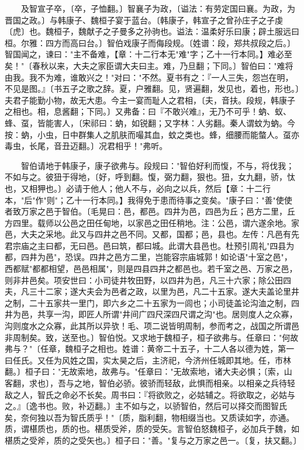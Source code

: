 　　及智宣子卒，〔卒，子恤翻。〕智襄子为政，〔谥法：有劳定国曰襄。为政，为晋国之政。〕与韩康子、魏桓子宴于蓝台。〔韩康子，韩宣子之曾孙庄子之子虔〔虎〕也。魏桓子，魏献子之子曼多之孙驹也。谥法：温柔好乐曰康；辟土服远曰桓。尔雅：四方而高曰台。〕智伯戏康子而侮段规。〔姓谱：段，郑共叔段之后。〕智国闻之，谏曰："主不备难，【章：十二行本无"难"字；乙十一行本同。】难必至矣！"〔春秋以来，大夫之家臣谓大夫曰主。难，乃旦翻；下同。〕智伯曰："难将由我。我不为难，谁敢兴之！"对曰："不然。夏书有之：『一人三失，怨岂在明，不见是图。』〔书五子之歌之辞。夏，户雅翻。见，贤遍翻，发见也，着也，形也。〕夫君子能勤小物，故无大患。今主一宴而耻人之君相，〔夫，音扶。段规，韩康子之相也。相，息酱翻；下同。〕又弗备：曰『不敢兴难』，无乃不可乎！蚋、蚁、蜂、虿，皆能害人，〔宋祁曰：蚋，如锐翻；又字林：人劣翻。秦人谓蚊为蚋。今按：蚋，小虫，日中群集人之肌肤而嘬其血，蚊之类也。蜂，细腰而能螫人。虿亦毒虫，长尾，音丑迈翻。〕况君相乎！"弗听。

　　智伯请地于韩康子，康子欲弗与。段规曰："智伯好利而愎，不与，将伐我；不如与之。彼狃于得地，〔好，呼到翻。愎，弼力翻，狠也。狃，女九翻，骄，忲也，又相狎也。〕必请于他人；他人不与，必向之以兵，然后【章：十二行本，"后"作"则"；乙十一行本同。】我得免于患而待事之变矣。"康子曰："善"使使者致万家之邑于智伯。〔毛晃曰：邑，都邑。四井为邑，四邑为丘；邑方二里，丘方四里。载师以公邑之田任甸地，以家邑之田任稍地。注：公邑，谓六遂余地。家邑，大夫之采地。此又与四井之邑不同。又都，国都；邑，县也。左传：凡邑有先君宗庙之主曰都，无曰邑。邑曰筑，都曰城。此谓大县邑也。杜预引周礼"四县为都，四井为邑"，恐误。四井之邑方二里，岂能容宗庙城郭！如论语"十室之邑"，西都赋"都都相望，邑邑相属"，则是四县四井之都邑也。若千室之邑、万家之邑，则非井邑矣。项安世曰：小司徒井牧田野，以四井为邑，凡三十六家；除公田四夫，凡三十二家；遂大夫会为邑者之政，以里为邑，凡二十五家。遂大夫盖论里井之制，二十五家共一里门，即六乡之二十五家为一闾也；小司徒盖论沟洫之制，四井为邑，共享一沟，即匠人所谓"井间广四尺深四尺谓之沟"也。居则度人之众寡，沟则度水之众寡，此其所以异欤！毛、项二说皆明周制，参而考之，战国之所谓邑非周制矣。致，送至也。〕智伯悦。又求地于魏桓子，桓子欲弗与。任章曰："何故弗与？"〔任章，魏桓子之相也。姓谱：黄帝二十五子，十二人各以德为姓，第一曰任氏。又任为风姓之国，实太昊之后，主济祀，今济州任城即其地。任，市林翻。〕桓子曰："无故索地，故弗与。"任章曰："无故索地，诸大夫必惧；〔索，山客翻，求也〕，吾与之地，智伯必骄。彼骄而轻敌，此惧而相亲。以相亲之兵待轻敌之人，智氏之命必不长矣。周书曰：『将欲败之，必姑辅之。将欲取之，必姑与之。』〔逸书也。败，补迈翻。〕主不如与之，以骄智伯，然后可以择交而图智氏矣，奈何独以吾为智氏质乎！"〔质，脂利翻，物相缀当也。又质读如字，亦通。质，谓椹质也，质的也。椹质受斧，质的受矢。言智伯怒魏桓子，必加兵于魏，如椹质之受斧，质的之受矢也。〕桓子曰："善。"复与之万家之邑一。〔复，扶又翻。〕

